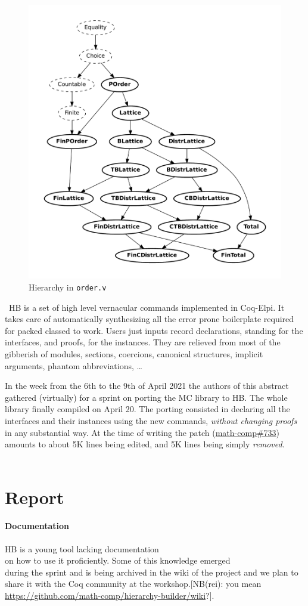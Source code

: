 \documentclass{easychair}
\def\MC{{\sf MC}}
\def\HB{{\sf HB}}
\begin{document}
\begin{figure}
  \vspace{-1em}
	\includegraphics[width=.40\textwidth]{order.pdf}
  \caption{\small Hierarchy in {\tt order.v}}
	\label{fig:order}
  
\end{figure}
\
\HB{} is a set of high level vernacular commands implemented in Coq-Elpi. It takes
care of automatically synthesizing all the error prone boilerplate required for
packed classed to work. Users just inputs record declarations,
standing for the interfaces, and proofs, for the instances.
They are relieved from
most of the gibberish of modules, sections, coercions, canonical
structures, implicit arguments, phantom abbreviations, \ldots

In the week from the 6th to the 9th of April 2021 the authors of this abstract
gathered (virtually) for a sprint on porting the \MC{} library to
\HB{}. The whole library finally compiled on April 20.
The porting consisted in declaring all the interfaces and their instances
using the new commands, \emph{without changing proofs} in any substantial way.
At the time of writing the patch (\href{https://github.com/math-comp/math-comp/pull/733}{math-comp\#733})
amounts to about 5K lines being edited, and 5K lines being simply \emph{removed}.\\
\
\vspace{-2em}
\section{Report}
\paragraph{Documentation}
\HB{} is a young tool lacking documentation\\
on how to use it proficiently. Some of this knowledge emerged\\
during the sprint and is being archived in the wiki of the project and we
plan to share it with the Coq community at the workshop.[NB(rei): you mean \url{https://github.com/math-comp/hierarchy-builder/wiki}?].
\end{document}
